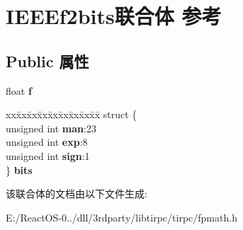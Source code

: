 \hypertarget{union_i_e_e_ef2bits}{}\section{I\+E\+E\+Ef2bits联合体 参考}
\label{union_i_e_e_ef2bits}
\subsection*{Public 属性}
\begin{DoxyCompactItemize}
\item 
\mbox{\label{union_i_e_e_ef2bits_ae6d6e95cf3d677688f6528608f48c780}} 
float {\bfseries f}
\item 
\mbox{\label{union_i_e_e_ef2bits_ae42df1c96777bf879ba92b2b3cbf0c94}} 
\begin{tabbing}
xx\=xx\=xx\=xx\=xx\=xx\=xx\=xx\=xx\=\kill
struct \{\\
\>unsigned int {\bfseries man}:23\\
\>unsigned int {\bfseries exp}:8\\
\>unsigned int {\bfseries sign}:1\\
\} {\bfseries bits}\\

\end{tabbing}\end{DoxyCompactItemize}


该联合体的文档由以下文件生成\+:\begin{DoxyCompactItemize}
\item 
E\+:/\+React\+O\+S-\/0../dll/3rdparty/libtirpc/tirpc/fpmath.\+h\end{DoxyCompactItemize}

